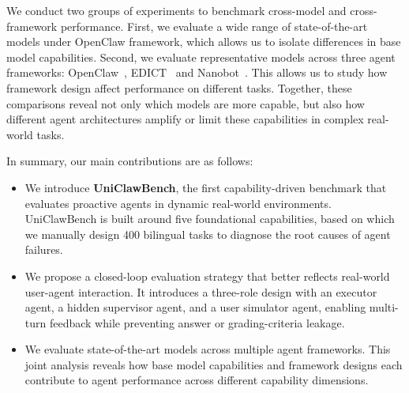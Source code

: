 We conduct two groups of experiments to benchmark cross-model and cross-framework performance. First, we evaluate a wide range of state-of-the-art models under OpenClaw framework, which allows us to isolate differences in base model capabilities. Second, we evaluate representative models across three agent frameworks: OpenClaw~\cite{openclaw}, EDICT~\cite{edict} and Nanobot~\cite{nanobot}. This allows us to study how framework design affect performance on different tasks. Together, these comparisons reveal not only which models are more capable, but also how different agent architectures amplify or limit these capabilities in complex real-world tasks.

In summary, our main contributions are as follows:
\begin{itemize}
    \item We introduce \textbf{UniClawBench}, the first capability-driven benchmark that evaluates proactive agents in dynamic real-world environments. UniClawBench is built around five foundational capabilities, based on which we manually design 400 bilingual tasks to diagnose the root causes of agent failures.
    
    \item We propose a closed-loop evaluation strategy that better reflects real-world user-agent interaction. It introduces a three-role design with an executor agent, a hidden supervisor agent, and a user simulator agent, enabling multi-turn feedback while preventing answer or grading-criteria leakage.
    
    \item We evaluate state-of-the-art models across multiple agent frameworks. This joint analysis reveals how base model capabilities and framework designs each contribute to agent performance across different capability dimensions.

\end{itemize}